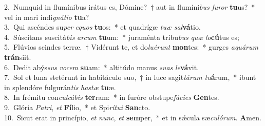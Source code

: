 {2.~}Numquid in flumínibus irátus es, Dómine?~† aut in flumíni\textit{bus} \textit{fu}\textit{ror} \textbf{tu}us?~* vel in mari indi\textit{gná}\textit{ti}\textit{o} \textbf{tu}a?\\
{3.~}Qui ascéndes su\textit{per} \textit{e}\textit{quos} \textbf{tu}os:~* et quadrígæ \textit{tu}\textit{æ} \textit{sal}\textbf{vá}tio.\\
{4.~}Súscitans suscitá\textit{bis} \textit{ar}\textit{cum} \textbf{tu}um:~* juraménta tríbu\textit{bus} \textit{quæ} \textit{lo}\textbf{cú}tus es;\\
{5.~}Flúvios scindes terræ.~† Vidérunt te, et do\textit{lu}\textit{é}\textit{runt} \textbf{mon}tes:~* gurges \textit{a}\textit{quá}\textit{rum} \textbf{trán}siit.\\
{6.~}Dedit abýs\textit{sus} \textit{vo}\textit{cem} \textbf{su}am:~* altitúdo manus \textit{su}\textit{as} \textit{le}\textbf{vá}vit.\\
{7.~}Sol et luna stetérunt in habitáculo suo,~† in luce sagit\textit{tá}\textit{rum} \textit{tu}\textbf{á}rum,~* ibunt in splendóre fulgurán\textit{tis} \textit{ha}\textit{stæ} \textbf{tu}æ.\\
{8.~}In frémitu con\textit{cul}\textit{cá}\textit{bis} \textbf{ter}ram:~* in furóre obstupe\textit{fá}\textit{ci}\textit{es} \textbf{Gen}tes.\\
{9.~}Glória \textit{Pa}\textit{tri}, \textit{et} \textbf{Fí}lio,~* et Spi\textit{rí}\textit{tu}\textit{i} \textbf{San}cto.\\
{10.~}Sicut erat in princípio, \textit{et} \textit{nunc}, \textit{et} \textbf{sem}per,~* et in sǽcula sæ\textit{cu}\textit{ló}\textit{rum}. \textbf{A}men.\\
